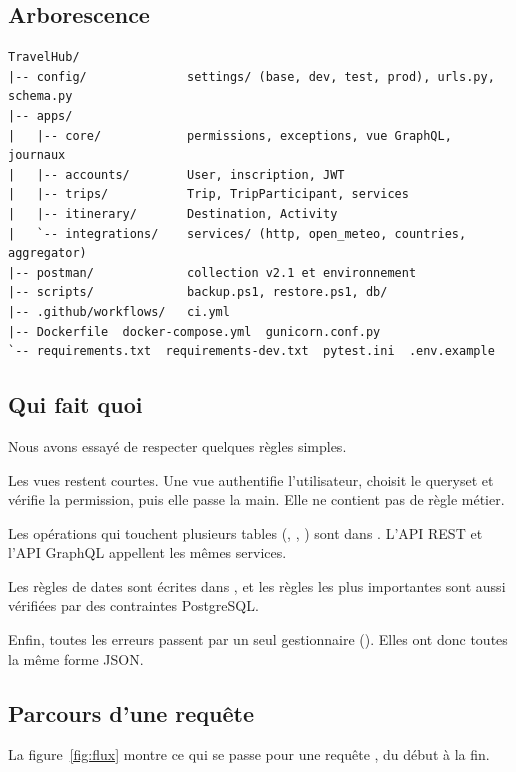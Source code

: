 \subsection{Arborescence}

\begin{lstlisting}[language={},caption={Arborescence du dépôt (simplifiée).},label={lst:arbo}]
TravelHub/
|-- config/              settings/ (base, dev, test, prod), urls.py, schema.py
|-- apps/
|   |-- core/            permissions, exceptions, vue GraphQL, journaux
|   |-- accounts/        User, inscription, JWT
|   |-- trips/           Trip, TripParticipant, services
|   |-- itinerary/       Destination, Activity
|   `-- integrations/    services/ (http, open_meteo, countries, aggregator)
|-- postman/             collection v2.1 et environnement
|-- scripts/             backup.ps1, restore.ps1, db/
|-- .github/workflows/   ci.yml
|-- Dockerfile  docker-compose.yml  gunicorn.conf.py
`-- requirements.txt  requirements-dev.txt  pytest.ini  .env.example
\end{lstlisting}

\subsection{Qui fait quoi}

Nous avons essayé de respecter quelques règles simples.

Les vues restent courtes. Une vue authentifie l'utilisateur, choisit le queryset et vérifie la permission, puis elle passe la main. Elle ne contient pas de règle métier.

Les opérations qui touchent plusieurs tables (, , ) sont dans . L'API REST et l'API GraphQL appellent les mêmes services.

Les règles de dates sont écrites dans , et les règles les plus importantes sont aussi vérifiées par des contraintes PostgreSQL.

Enfin, toutes les erreurs passent par un seul gestionnaire (). Elles ont donc toutes la même forme JSON.

\subsection{Parcours d'une requête}

La figure~\ref{fig:flux} montre ce qui se passe pour une requête , du début à la fin.

